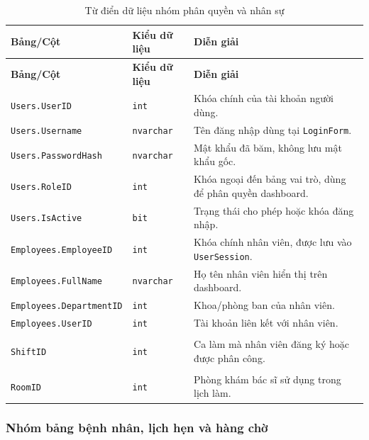 \documentclass[12pt,a4paper]{article}
\numberwithin{figure}{subsection}
\numberwithin{table}{subsection}
\begin{document}
\begin{longtable}{|p{4.4cm}|p{2.4cm}|p{6.8cm}|}
\caption{Từ điển dữ liệu nhóm phân quyền và nhân sự} \\
\hline
\textbf{Bảng/Cột} & \textbf{Kiểu dữ liệu} & \textbf{Diễn giải} \\
\hline
\endfirsthead
\hline
\textbf{Bảng/Cột} & \textbf{Kiểu dữ liệu} & \textbf{Diễn giải} \\
\hline
\endhead
\texttt{Users.UserID} & \texttt{int} & Khóa chính của tài khoản người dùng. \\
\hline
\texttt{Users.Username} & \texttt{nvarchar} & Tên đăng nhập dùng tại \texttt{LoginForm}. \\
\hline
\texttt{Users.PasswordHash} & \texttt{nvarchar} & Mật khẩu đã băm, không lưu mật khẩu gốc. \\
\hline
\texttt{Users.RoleID} & \texttt{int} & Khóa ngoại đến bảng vai trò, dùng để phân quyền dashboard. \\
\hline
\texttt{Users.IsActive} & \texttt{bit} & Trạng thái cho phép hoặc khóa đăng nhập. \\
\hline
\texttt{Employees.EmployeeID} & \texttt{int} & Khóa chính nhân viên, được lưu vào \texttt{UserSession}. \\
\hline
\texttt{Employees.FullName} & \texttt{nvarchar} & Họ tên nhân viên hiển thị trên dashboard. \\
\hline
\texttt{Employees.DepartmentID} & \texttt{int} & Khoa/phòng ban của nhân viên. \\
\hline
\texttt{Employees.UserID} & \texttt{int} & Tài khoản liên kết với nhân viên. \\
\hline
\makecell[l]{\texttt{EmployeeShifts}\\\texttt{ShiftID}} & \texttt{int} & Ca làm mà nhân viên đăng ký hoặc được phân công. \\
\hline
\makecell[l]{\texttt{DoctorSchedules}\\\texttt{RoomID}} & \texttt{int} & Phòng khám bác sĩ sử dụng trong lịch làm. \\
\hline
\end{longtable}

\subsubsection{Nhóm bảng bệnh nhân, lịch hẹn và hàng chờ}
\end{document}
